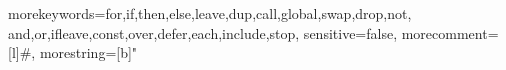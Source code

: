 \documentclass{article}
\begin{document}
{morekeywords={for,if,then,else,leave,dup,call,global,swap,drop,not,
and,or,ifleave,const,over,defer,each,include,stop},
sensitive=false,
morecomment=[l]{\#},
morestring=[b]"
}



\end{document}
